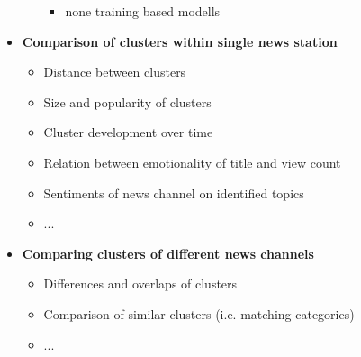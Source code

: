 \documentclass[12pt,a4paper]{scrartcl}
\begin{document}
\begin{itemize}
\begin{itemize}
\begin{itemize}
			\item none training based modells
		\end{itemize}
	\end{itemize}
	\item[\labelitemi] \textbf{Comparison of clusters within single news station}
	\begin{itemize}
		\item Distance between clusters
		\item Size and popularity of clusters
		\item Cluster development over time
		\item Relation between emotionality of title and view count
		\item Sentiments of news channel on identified topics
		\item ...
	\end{itemize}
	\item[\labelitemi] \textbf{Comparing clusters of different news channels}
	\begin{itemize}
		\item Differences and overlaps of clusters
		\item Comparison of similar clusters (i.e. matching categories)
		\item ...
	\end{itemize}
\end{itemize}
\end{document}
